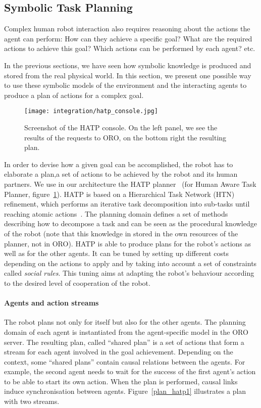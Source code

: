 
\subsection{Symbolic Task Planning}
\label{sect|hatp}

Complex human robot interaction also requires reasoning about the actions the
agent can perform: How can they achieve a specific goal? What are the required
actions to achieve this goal? Which actions can be performed by each agent?
etc.

In the previous sections, we have seen how symbolic knowledge is produced and
stored from the real physical world. In this section, we present one possible
way to use these symbolic models of the environment and the interacting agents to
produce a plan of actions for a complex goal.

\begin{figure}
    \centering
    \texttt{[image: integration/hatp\_console.jpg]}
    \caption{Screenshot of the HATP console. On the left panel, we see the
    results of the requests to ORO, on the bottom right the resulting plan.}
    \label{fig|hatp_console}
\end{figure}

In order to devise how a given goal can be accomplished, the robot has to
elaborate a plan,\ie a set of actions to be achieved by the robot and its human
partners.  We use in our architecture the HATP planner~\cite{Alili2009} (for
Human Aware Task Planner, figure~\ref{fig|hatp_console}).  HATP is based on a
Hierarchical Task Network (HTN) refinement, which performs an iterative task
decomposition into sub-tasks until reaching atomic actions~\cite{Nau2003}.  The
planning domain defines a set of methods describing how to decompose a task and
can be seen as the procedural knowledge of the robot (note that this knowledge
in stored in the own resources of the planner, not in ORO).  HATP is able to
produce plans for the robot's actions as well as for the other agents. It can
be tuned by setting up different costs depending on the actions to apply and by
taking into account a set of constraints called \emph{social rules}. This
tuning aims at adapting the robot's behaviour according to the desired level of
cooperation of the robot.

\paragraph{Agents and action streams} The robot plans not only for itself but
also for the other agents. The planning domain of each agent is instantiated
from the agent-specific model in the ORO server. The resulting plan, called
``shared plan'' is a set of actions that form a stream for each agent involved
in the goal achievement.  Depending on the context, some ``shared plans''
contain causal relations between the agents. For example, the second agent
needs to wait for the success of the first agent's action to be able to start
its own action. When the plan is performed, causal links induce synchronisation
between agents.  Figure~\ref{plan_hatp1} illustrates a plan with two streams.

